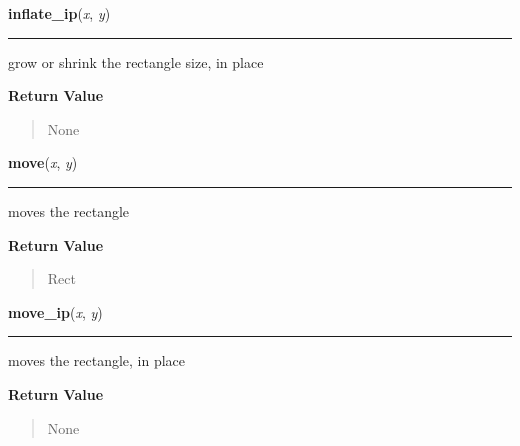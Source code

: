 \hspace{.8\funcindent}\begin{boxedminipage}{\funcwidth}

    \raggedright \textbf{inflate\_ip}(\textit{x}, \textit{y})

    \vspace{-1.5ex}

    \rule{\textwidth}{0.5\fboxrule}
\setlength{\parskip}{2ex}
    grow or shrink the rectangle size, in place

\setlength{\parskip}{1ex}
      \textbf{Return Value}
    \vspace{-1ex}

      \begin{quote}
      None

      \end{quote}

    \end{boxedminipage}

    \label{pygame:Rect:move}

    \vspace{0.5ex}

\hspace{.8\funcindent}\begin{boxedminipage}{\funcwidth}

    \raggedright \textbf{move}(\textit{x}, \textit{y})

    \vspace{-1.5ex}

    \rule{\textwidth}{0.5\fboxrule}
\setlength{\parskip}{2ex}
    moves the rectangle

\setlength{\parskip}{1ex}
      \textbf{Return Value}
    \vspace{-1ex}

      \begin{quote}
      Rect

      \end{quote}

    \end{boxedminipage}

    \label{pygame:Rect:move_ip}

    \vspace{0.5ex}

\hspace{.8\funcindent}\begin{boxedminipage}{\funcwidth}

    \raggedright \textbf{move\_ip}(\textit{x}, \textit{y})

    \vspace{-1.5ex}

    \rule{\textwidth}{0.5\fboxrule}
\setlength{\parskip}{2ex}
    moves the rectangle, in place

\setlength{\parskip}{1ex}
      \textbf{Return Value}
    \vspace{-1ex}

      \begin{quote}
      None

      \end{quote}

    \end{boxedminipage}

